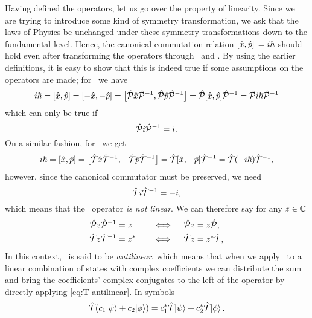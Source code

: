         Having defined the operators, let us go over the property of linearity. Since we are trying to introduce some kind of symmetry transformation, we ask that the laws of Physics be unchanged under these symmetry transformations down to the fundamental level. Hence, the canonical commutation relation $\comm*{\hx}{\hp} = i \hbar$ should hold even after transforming the operators through \hP\ and \hT. By using the earlier definitions, it is easy to show that this is indeed true if some assumptions on the operators are made; for \hP\ we have
        \begin{align*}
            i \hbar 
            = \comm*{\hx}{\hp}\! 
            = \comm*{-\hx}{-\hp} \!
            = \bigl[\hP \hx \hP^{-1},\hP \hp \hP^{-1}\bigr] 
            = \hP \comm*{\hx}{\hp}\! \hP^{-1} 
            = \hP i \hbar \hP^{-1} 
        \end{align*}
        which can only be true if
        \begin{equation}
            \label{eq:PiP}
            \mathcal{\hat{P}} i \mathcal{\hat{P}}^{-1} = i
            \text{.}
        \end{equation}
        On a similar fashion, for \hT\ we get
        \begin{align*}
            i \hbar
            = \comm*{\hx}{\hp}\! 
            = \bigl[\hT \hx \hT^{-1},-\hT \hp \hT^{-1}\bigr] 
            = \hT \comm*{\hx}{-\hp}\! \hT^{-1}
            = \hT \pqty{-i \hbar} \hT^{-1}
            \mycomma
        \end{align*}
        however, since the canonical commutator must be preserved, we need
        \begin{equation}
            \label{eq:TiT}
            \mathcal{\hat{T}} i \mathcal{\hat{T}}^{-1} = -i
            \text{,}
        \end{equation}
        which means that the \hT\ operator \emph{is not linear}. We can therefore say for any $z \in \mathbb{C}$ 
        \begin{alignat}{3}
            \label{eq:P-linear}
            \mathcal{\hat{P}} z \mathcal{\hat{P}}^{-1} &= z        
            &\quad\iff\quad 
            \mathcal{\hat{P}} z &= z \mathcal{\hat{P}}
            \text{,}
            \\
            \label{eq:T-antilinear}
            \mathcal{\hat{T}} z \mathcal{\hat{T}}^{-1} &= z^* 
            &\quad\iff\quad 
            \mathcal{\hat{T}} z &= z^* \mathcal{\hat{T}}
            \text{,}
        \end{alignat}
        In this context, \hT\ is said to be \emph{antilinear}, which means that when we apply \hT\ to a linear combination of states with complex coefficients we can distribute the sum and bring the coefficients' complex conjugates to the left of the operator by directly applying \eqref{eq:T-antilinear}. In symbols
        \begin{equation*}
            \hT\pqty{c_1\!\ket{\psi} + c_2\!\ket{\phi}}
            = c_1^* \hT\!\ket{\psi} + c_2^* \hT\!\ket{\phi}
            \myperiod
        \end{equation*}

